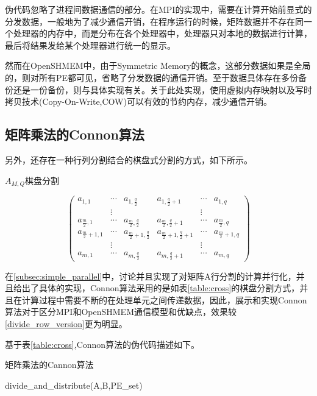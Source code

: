 伪代码忽略了进程间数据通信的部分。在MPI的实现中，需要在计算开始前显式的分发数据，一般地为了减少通信开销，在程序运行的时候，矩阵数据并不存在同一个处理器的内存中，而是分布在各个处理器中，处理器只对本地的数据进行计算，最后将结果发给某个处理器进行统一的显示。

然而在OpenSHMEM中，由于Symmetric Memory的概念，这部分数据如果是全局的，则对所有PE都可见，省略了分发数据的通信开销。至于数据具体存在多份备份还是一份备份，则与具体实现有关。关于此处实现，使用虚拟内存映射以及写时拷贝技术(Copy-On-Write,COW)可以有效的节约内存，减少通信开销\cite{jour:intra-node}。
\subsection{矩阵乘法的Connon算法}
另外，还存在一种行列分割结合的棋盘式分割的方式，如下所示。
\begin{table}
\caption{$A_{M,Q}$棋盘分割}\label{table:cross}
\begin{center}
\[
\left(\begin{array}{ccc|ccc}
a_{1,1} & \cdots & a_{1,\frac{q}{2}} & a_{1,\frac{q}{2}+1} & \cdots & a_{1,q} \\
 & \vdots & & & \vdots & \\
a_{\frac{m}{2},1} & \cdots & a_{\frac{m}{2},\frac{q}{2}} & a_{\frac{m}{2},\frac{q}{2}+1} & \cdots & a_{\frac{m}{2},q} \\
\hline
a_{\frac{m}{2}+1,1} & \cdots & a_{\frac{m}{2}+1,\frac{q}{2}} &a_{\frac{m}{2}+1,\frac{q}{2}+1} & \cdots & a_{\frac{m}{2}+1,q} \\
& \vdots & & & \vdots & \\
a_{m,1} & \cdots & a_{m,\frac{q}{2}} & a_{m,\frac{q}{2}+1} & \cdots & a_{m,q}
\end{array}\right)
\]
\end{center}
\end{table}
在\ref{subsec:simple_parallel}中，讨论并且实现了对矩阵A行分割的计算并行化，并且给出了具体的实现，Connon算法采用的是如表\ref{table:cross}的棋盘分割方式，并且在计算过程中需要不断的在处理单元之间传递数据，因此，展示和实现Connon算法对于区分MPI和OpenSHMEM通信模型和优缺点，效果较\ref{divide_row_version}更为明显。

基于表\ref{table:cross},Connon算法的伪代码描述如下。
\begin{algorithm}
\hline
\caption{矩阵乘法的Cannon算法}
\begin{algorithmicx}
\hline
{}
\State divide\_and\_distribute(A,B,PE\_set)
\EndFunction
\end{algorithmicx}
\hline
\end{algorithm}
